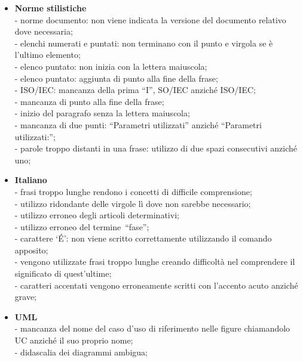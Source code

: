 \begin{itemize}

\item \textbf{Norme stilistiche}\\

- norme documento: non viene indicata la versione del documento relativo dove  necessaria;\\
- elenchi numerati e puntati: non terminano con il punto e virgola se è l’ultimo elemento; \\
- elenco puntato: non inizia con la lettera maiuscola;\\
- elenco puntato: aggiunta di punto alla fine della frase;\\
- ISO/IEC: mancanza della prima “I”, SO/IEC anziché ISO/IEC;\\
- mancanza di punto alla fine della frase;\\
- inizio del paragrafo senza la lettera maiuscola;\\
- mancanza di due punti: “Parametri utilizzati” anziché “Parametri utilizzati:”;\\
- parole troppo distanti in una frase: utilizzo di due spazi consecutivi anziché uno;\\


\item \textbf{Italiano}\\

- frasi troppo lunghe rendono i concetti di difficile comprensione; \\
- utilizzo ridondante delle virgole lì dove non sarebbe necessario;\\
- utilizzo erroneo degli articoli determinativi;\\
- utilizzo erroneo del termine “fase”;\\
- carattere ‘\'E’: non viene scritto correttamente utilizzando il comando apposito;\\
- vengono utilizzate frasi troppo lunghe creando difficoltà nel comprendere il significato di quest’ultime;\\
- caratteri accentati vengono erroneamente scritti con l’accento acuto anziché grave;\\


\item \textbf{UML}\\

- mancanza del nome del caso d’uso di riferimento nelle figure chiamandolo UC anziché il suo proprio nome;\\
- didascalia dei diagrammi ambigua;




\end{itemize}
